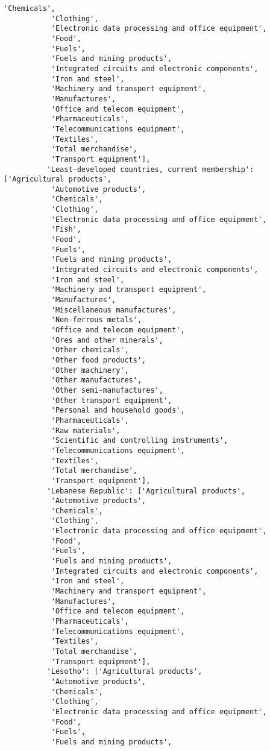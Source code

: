 \documentclass[11pt]{article}
\begin{document}
\begin{Verbatim}[commandchars=\\\{\}]
           'Chemicals',
           'Clothing',
           'Electronic data processing and office equipment',
           'Food',
           'Fuels',
           'Fuels and mining products',
           'Integrated circuits and electronic components',
           'Iron and steel',
           'Machinery and transport equipment',
           'Manufactures',
           'Office and telecom equipment',
           'Pharmaceuticals',
           'Telecommunications equipment',
           'Textiles',
           'Total merchandise',
           'Transport equipment'],
          'Least-developed countries, current membership': ['Agricultural products',
           'Automotive products',
           'Chemicals',
           'Clothing',
           'Electronic data processing and office equipment',
           'Fish',
           'Food',
           'Fuels',
           'Fuels and mining products',
           'Integrated circuits and electronic components',
           'Iron and steel',
           'Machinery and transport equipment',
           'Manufactures',
           'Miscellaneous manufactures',
           'Non-ferrous metals',
           'Office and telecom equipment',
           'Ores and other minerals',
           'Other chemicals',
           'Other food products',
           'Other machinery',
           'Other manufactures',
           'Other semi-manufactures',
           'Other transport equipment',
           'Personal and household goods',
           'Pharmaceuticals',
           'Raw materials',
           'Scientific and controlling instruments',
           'Telecommunications equipment',
           'Textiles',
           'Total merchandise',
           'Transport equipment'],
          'Lebanese Republic': ['Agricultural products',
           'Automotive products',
           'Chemicals',
           'Clothing',
           'Electronic data processing and office equipment',
           'Food',
           'Fuels',
           'Fuels and mining products',
           'Integrated circuits and electronic components',
           'Iron and steel',
           'Machinery and transport equipment',
           'Manufactures',
           'Office and telecom equipment',
           'Pharmaceuticals',
           'Telecommunications equipment',
           'Textiles',
           'Total merchandise',
           'Transport equipment'],
          'Lesotho': ['Agricultural products',
           'Automotive products',
           'Chemicals',
           'Clothing',
           'Electronic data processing and office equipment',
           'Food',
           'Fuels',
           'Fuels and mining products',

\end{Verbatim}
\end{document}
